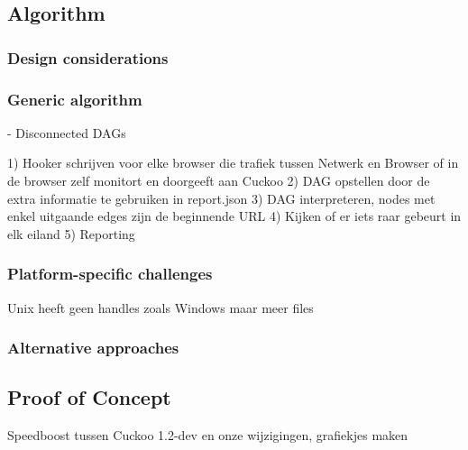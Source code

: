 \subsection{Algorithm}

\subsubsection{Design considerations}

\subsubsection{Generic algorithm}

- Disconnected DAGs

1) Hooker schrijven voor elke browser die trafiek tussen Netwerk en Browser of in de browser zelf monitort en doorgeeft aan Cuckoo
2) DAG opstellen door de extra informatie te gebruiken in report.json
3) DAG interpreteren, nodes met enkel uitgaande edges zijn de beginnende URL
4) Kijken of er iets raar gebeurt in elk eiland
5) Reporting

\subsubsection{Platform-specific challenges}

Unix heeft geen handles zoals Windows maar meer files

\subsubsection{Alternative approaches}

\subsection{Proof of Concept}
Speedboost tussen Cuckoo 1.2-dev en onze wijzigingen, grafiekjes maken